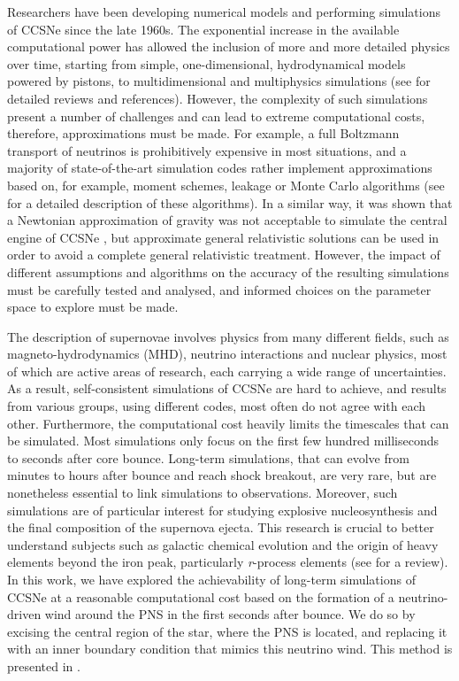 Researchers have been developing numerical models and performing simulations of CCSNe since the late 1960s. The exponential increase in the available computational power has allowed the inclusion of more and more detailed physics over time, starting from simple, one-dimensional, hydrodynamical models powered by pistons, to multidimensional and multiphysics simulations (see \citealt{Janka2012, Mezzacappa2020, Boccioli2024} for detailed reviews and references). However, the complexity of such simulations present a number of challenges and can lead to extreme computational costs, therefore, approximations must be made. For example, a full Boltzmann transport of neutrinos is prohibitively expensive in most situations, and a majority of state-of-the-art simulation codes rather implement approximations based on, for example, moment schemes, leakage or Monte Carlo algorithms (see \citealt{Foucart2023,Mezzacappa2020_Review} for a detailed description of these algorithms). In a similar way, it was shown that a Newtonian approximation of gravity was not acceptable to simulate the central engine of CCSNe \citep{Muller2012,OConnor2018a}, but approximate general relativistic solutions can be used in order to avoid a complete general relativistic treatment. However, the impact of different assumptions and algorithms on the accuracy of the resulting simulations must be carefully tested and analysed, and informed choices on the parameter space to explore must be made.

The description of supernovae involves physics from many different fields, such as magneto-hydrodynamics (MHD), neutrino interactions and nuclear physics, most of which are active areas of research, each carrying a wide range of uncertainties. As a result, self-consistent simulations of CCSNe are hard to achieve, and results from various groups, using different codes, most often do not agree with each other. Furthermore, the computational cost heavily limits the timescales that can be simulated. Most simulations only focus on the first few hundred milliseconds to seconds after core bounce. Long-term simulations, that can evolve from minutes to hours after bounce and reach shock breakout, are very rare, but are nonetheless essential to link simulations to observations. Moreover, such simulations are of particular interest for studying explosive nucleosynthesis and the final composition of the supernova ejecta. This research is crucial to better understand subjects such as galactic chemical evolution and the origin of heavy elements beyond the iron peak, particularly \emph{r}-process elements (see \citealt{Arcones2023} for a review). 
In this work, we have explored the achievability of long-term simulations of CCSNe at a reasonable computational cost based on the formation of a neutrino-driven wind around the PNS in the first seconds after bounce. We do so by excising the central region of the star, where the PNS is located, and replacing it with an inner boundary condition that mimics this neutrino wind. This method is presented in .

